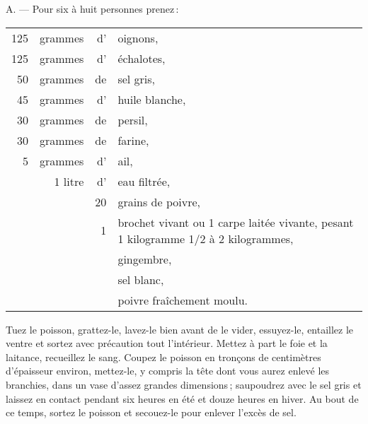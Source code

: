 \medskip

A. — Pour six à huit personnes prenez :

\footnotesize
\begin{longtable}{rrrp{16em}}
    125 & grammes & d' & oignons,                                                                         \\
    125 & grammes & d' & échalotes,                                                                       \\
     50 & grammes & de & sel gris,                                                                        \\
     45 & grammes & d' & huile blanche,                                                                   \\
     30 & grammes & de & persil,                                                                          \\
     30 & grammes & de & farine,                                                                          \\
      5 & grammes & d' & ail,                                                                             \\
        & 1 litre & d’ & eau filtrée,                                                                     \\
        &         & 20 & grains de poivre,                                                                \\
        &         &  1 & brochet vivant ou 1 carpe laitée vivante,
                         pesant 1 kilogramme 1/2 à 2 kilogrammes,                                         \\
        &         &    & gingembre,                                                                       \\
        &         &    & sel blanc,                                                                       \\
        &         &    & poivre fraîchement moulu.                                                        \\
\end{longtable}
\normalsize

Tuez le poisson, grattez-le, lavez-le bien avant de le vider, essuyez-le,
entaillez le ventre et sortez avec précaution tout l'intérieur. Mettez à part
le foie et la laitance, recueillez le sang. Coupez le poisson en tronçons de
{\mmm} centimètres d'épaisseur environ, mettez-le, y compris la tête dont
vous aurez enlevé les branchies, dans un vase d'assez grandes dimensions ;
saupoudrez avec le sel gris et laissez en contact pendant six heures en été et
douze heures en hiver. Au bout de ce temps, sortez le poisson et secouez-le
pour enlever l'excès de sel.

